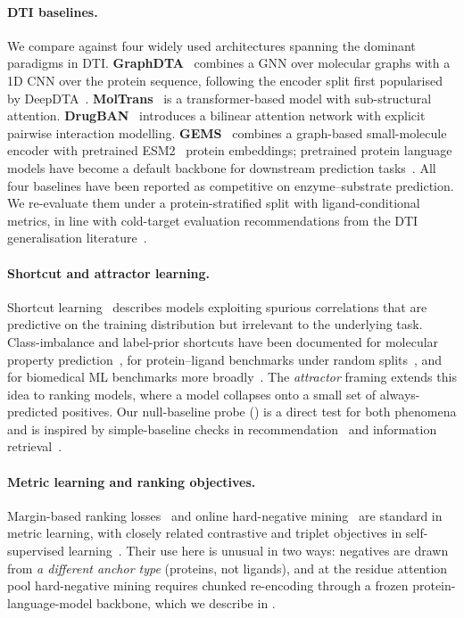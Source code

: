 \documentclass[11pt,a4paper]{article}
\begin{document}
\paragraph{DTI baselines.}
We compare against four widely used architectures spanning the dominant
paradigms in DTI. \textbf{GraphDTA}~\citep{nguyen2021graphdta} combines
a GNN over molecular graphs with a 1D CNN over the protein sequence,
following the encoder split first popularised by
DeepDTA~\citep{ozturk2018deepdta}. \textbf{MolTrans}~\citep{huang2021moltrans}
is a transformer-based model with sub-structural attention.
\textbf{DrugBAN}~\citep{bai2023drugban} introduces a bilinear attention
network with explicit pairwise interaction modelling. \textbf{GEMS}~\citep{wang2023gems}
combines a graph-based small-molecule encoder with pretrained
ESM2~\citep{lin2023esm2} protein embeddings; pretrained protein
language models have become a default backbone for downstream
prediction tasks~\citep{rives2021esm1b,elnaggar2022prottrans}. All four
baselines have been reported as competitive on enzyme--substrate
prediction. We re-evaluate them under a protein-stratified split with
ligand-conditional metrics, in line with cold-target evaluation
recommendations from the DTI generalisation
literature~\citep{pahikkala2015,jiang2020dtigeneralisation}.

\paragraph{Shortcut and attractor learning.}
Shortcut learning~\citep{geirhos2020shortcut} describes models
exploiting spurious correlations that are predictive on the training
distribution but irrelevant to the underlying task. Class-imbalance
and label-prior shortcuts have been documented for molecular
property prediction~\citep{nguyen2024dataleakage}, for protein--ligand
benchmarks under random splits~\citep{wallach2018mostligands,kapoor2023leakage},
and for biomedical ML benchmarks more
broadly~\citep{kapoor2023leakage}. The \emph{attractor} framing extends
this idea to ranking models, where a model collapses onto a small set
of always-predicted positives. Our null-baseline probe
() is a direct test for both phenomena and is
inspired by simple-baseline checks in
recommendation~\citep{rendle2019baselines} and information
retrieval~\citep{lin2019baseline}.

\paragraph{Metric learning and ranking objectives.}
Margin-based ranking losses~\citep{schroff2015facenet,sohn2016npair}
and online hard-negative mining~\citep{harwood2017smartmining,wu2017sampling}
are standard in metric learning, with closely related contrastive and
triplet objectives in self-supervised
learning~\citep{oord2018cpc,chen2020simclr}. Their use here is unusual
in two ways: negatives are drawn from \emph{a different anchor type}
(proteins, not ligands), and at the residue attention pool
hard-negative mining requires chunked re-encoding through a frozen
protein-language-model backbone, which we describe in
.
\end{document}
